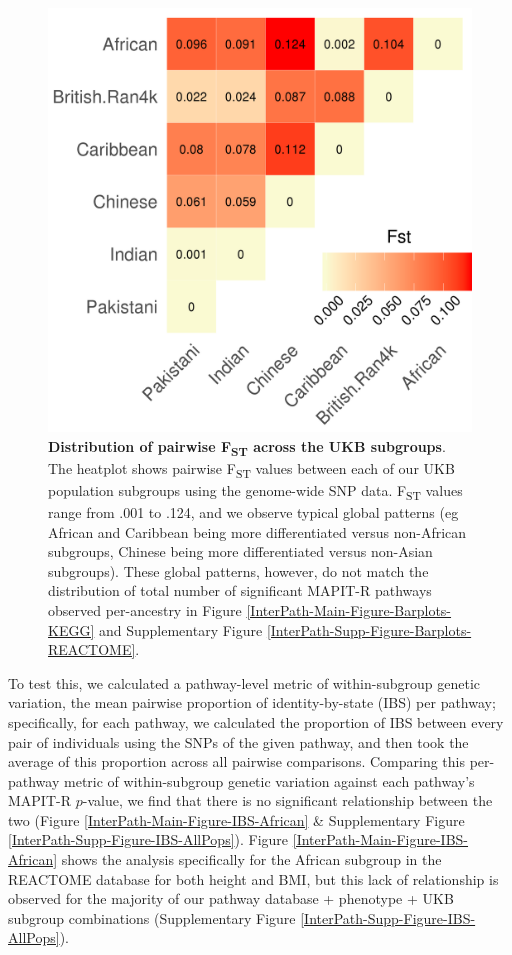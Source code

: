 \documentclass[12pt,a4paper]{article}
\begin{document}
\begin{figure}[htb]
\centering
\includegraphics[scale=.5]{Images/Main/InterPath_Main_Figure_Fst_vs2.png}
\caption[TBD]{\textbf{Distribution of pairwise F\textsubscript{ST} across the UKB subgroups}. The heatplot shows pairwise F\textsubscript{ST} values between each of our UKB population subgroups using the genome-wide SNP data. F\textsubscript{ST} values range from .001 to .124, and we observe typical global patterns (eg African and Caribbean being more differentiated versus non-African subgroups, Chinese being more differentiated versus non-Asian subgroups). These global patterns, however, do not match the distribution of total number of significant MAPIT-R pathways observed per-ancestry in Figure \ref{InterPath-Main-Figure-Barplots-KEGG} and Supplementary Figure \ref{InterPath-Supp-Figure-Barplots-REACTOME}.}
\label{InterPath-Main-Figure-Fst}
\end{figure}

To test this, we calculated a pathway-level metric of within-subgroup genetic variation, the mean pairwise proportion of identity-by-state (IBS) per pathway; specifically, for each pathway, we calculated the proportion of IBS between every pair of individuals using the SNPs of the given pathway, and then took the average of this proportion across all pairwise comparisons.  Comparing this per-pathway metric of within-subgroup genetic variation against each pathway's MAPIT-R $p$-value, we find that there is no significant relationship between the two (Figure \ref{InterPath-Main-Figure-IBS-African} \& Supplementary Figure \ref{InterPath-Supp-Figure-IBS-AllPops}). Figure \ref{InterPath-Main-Figure-IBS-African} shows the analysis specifically for the African subgroup in the REACTOME database for both height and BMI, but this lack of relationship is observed for the majority of our pathway database + phenotype + UKB subgroup combinations (Supplementary Figure \ref{InterPath-Supp-Figure-IBS-AllPops}). 
\end{document}
